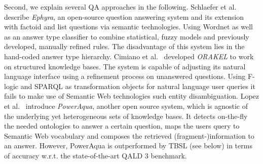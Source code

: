 Second, we explain several QA approaches in the following.
{Schlaefer et al.~\cite{ephyra2007}} describe \emph{Ephyra}, an open-source question answering system and its extension with factoid and list questions via semantic technologies.
Using Wordnet as well as an answer type classifier to combine statistical, fuzzy models and previously developed, manually refined rules. The disadvantage of this system lies in the hand-coded answer type hierarchy. %
Cimiano et al.~\cite{orakel} developed \emph{ORAKEL} to work on structured knowledge bases.
The system is capable of adjusting its natural language interface using a refinement process on unanswered questions. 
Using F-logic and SPARQL as transformation objects for natural language user queries it fails to make use of Semantic Web technologies such entity disambiguation.
{Lopez et al.~\cite{poweraqua}} introduce \emph{PowerAqua}, another open source system, which is agnostic of the underlying yet heterogeneous sets of knowledge bases. 
It detects on-the-fly the needed ontologies to answer a certain question, maps the users query to Semantic Web vocabulary and composes the retrieved (fragment-)information to an answer. However, PowerAqua is outperformed by TBSL (see below) in terms of accuracy w.r.t. the state-of-the-art QALD 3 benchmark.
